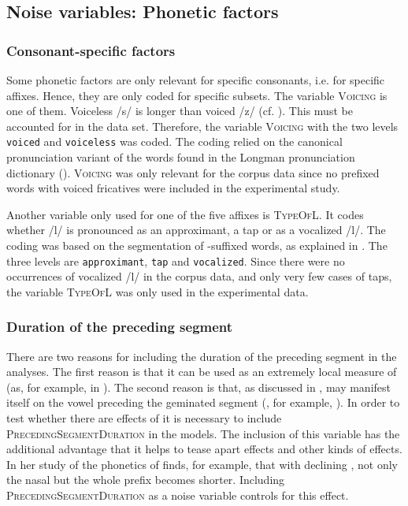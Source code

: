 \subsection{Noise variables: Phonetic factors}

\subsubsection{Consonant-specific factors} Some phonetic factors are only relevant for specific consonants, i.e. for specific affixes. Hence, they are only coded for specific subsets. The variable \textsc{Voicing} is one of them. Voiceless /s/ is longer than voiced /z/ (cf. \citealt{Umeda.1977}). This must be accounted for in the data set. Therefore, the variable \textsc{Voicing} with the two levels \texttt{voiced} and \texttt{voiceless} was coded. The coding relied on the canonical pronunciation variant of the words found in the Longman pronunciation dictionary (\citealt{Wells.2008}). \textsc{Voicing} was only relevant for the corpus data since no prefixed words with voiced fricatives were included in the experimental study.

Another variable only used for one of the five affixes is \textsc{TypeOfL}. It codes whether /l/ is pronounced as an approximant, a tap or as a vocalized /l/. The coding was based on the segmentation of -suffixed words, as explained in . The three levels are \texttt{approximant}, \texttt{tap} and \texttt{vocalized}.  Since there were no occurrences of vocalized /l/ in the corpus data, and only very few cases of taps, the variable \textsc{TypeOfL} was only used in the experimental data.


\subsubsection{Duration of the preceding segment} 
There are two reasons for including the duration of the preceding segment in the analyses. The first reason is that it can be used as an extremely local measure of  (as, for example, in \citealt{Ernestus.2006}). The second reason is that, as discussed in ,  may manifest itself on the vowel preceding the geminated segment (, for example, \citealt{Ridouane.2010, Miller.1987, Oh.2012}). In order to test whether there are effects of  it is necessary to include \textsc{PrecedingSegmentDuration} in the models. The inclusion of this variable has the additional advantage that it helps to tease apart  effects and other kinds of  effects. In her study of the phonetics of  \cite{Hay.2007} finds, for example, that with declining ,  not only the nasal but the whole prefix becomes shorter. Including \textsc{PrecedingSegmentDuration} as a noise variable controls for this effect. 


